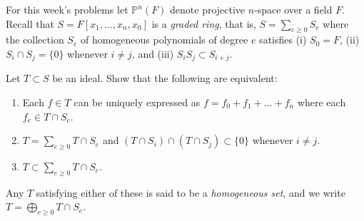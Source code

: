 \documentclass[12 pt, letterpaper]{hmcpset}
\begin{document}
For this week's problems let $\mathbb{P}^{n}(F)$ denote projective $n$-space over a field $F$. Recall that $S = F[x_{1}, \dots, x_{n}, x_{0}]$ is a \emph{graded ring}, that is, $S = \sum_{e \ge 0} S_{e}$ where the collection $S_{e}$ of homogeneous polynomials of degree $e$ satisfies (i) $S_{0} = F$, (ii) $S_{i} \cap S_{j} = \{ 0 \}$ whenever $i \neq j$, and (iii) $S_{i} S_{j} \subset S_{i + j}$.

\begin{problem}[Problem 1.]
	Let $T \subset S$ be an ideal. Show that the following are equivalent:
	\begin{enumerate}[label = (\roman*)]
		\item Each $f \in T$ can be uniquely expressed as $f = f_{0} + f_{1} + \dots + f_{n}$ where each $f_{e} \in T \cap S_{e}$.
		\item $T = \sum_{e \ge 0} T \cap S_{e}$ and $(T \cap S_{i}) \cap (T \cap S_{j}) \subset \{ 0 \}$ whenever $i \neq j$.
		\item $T \subset \sum_{e \ge 0} T \cap S_{e}$.
	\end{enumerate}
	Any $T$ satisfying either of these is said to be a \emph{homogeneous set}, and we write ${T = \bigoplus_{e \ge 0} T \cap S_{e}}$.
\end{problem}
\end{document}
